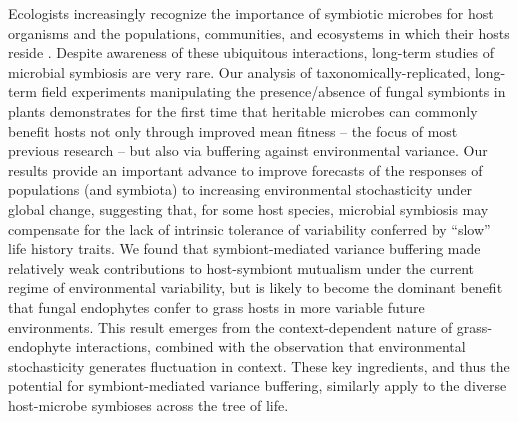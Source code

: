 \documentclass[9pt,twocolumn,twoside]{pnas-new}
\begin{document}
Ecologists increasingly recognize the importance of symbiotic microbes for host organisms and the populations, communities, and ecosystems in which their hosts reside \cite{afkhami2016native,smith2017symbiont,dallas2022captivity,wu2022reduction}.
Despite awareness of these ubiquitous interactions, long-term studies of microbial symbiosis are very rare. 
Our analysis of taxonomically-replicated, long-term field experiments manipulating the presence/absence of fungal symbionts in plants demonstrates for the first time that heritable microbes can commonly benefit hosts not only through improved mean fitness -- the focus of most previous research -- but also via buffering against environmental variance. 
Our results provide an important advance to improve forecasts of the responses of populations (and symbiota) to increasing environmental stochasticity under global change, suggesting that, for some host species, microbial symbiosis may compensate for the lack of intrinsic tolerance of variability conferred by ``slow'' life history traits. 
We found that symbiont-mediated variance buffering made relatively weak contributions to host-symbiont mutualism under the current regime of environmental variability, but is likely to become the dominant benefit that fungal endophytes confer to grass hosts in more variable future environments.
This result emerges from the context-dependent nature of grass-endophyte interactions, combined with the observation that environmental stochasticity generates fluctuation in context. 
These key ingredients, and thus the potential for symbiont-mediated variance buffering, similarly apply to the diverse host-microbe symbioses across the tree of life. 
\end{document}
